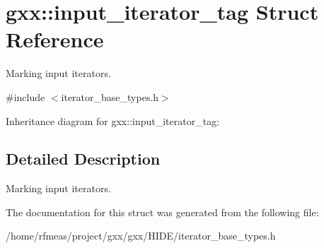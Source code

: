 \hypertarget{structgxx_1_1input__iterator__tag}{}\section{gxx\+:\+:input\+\_\+iterator\+\_\+tag Struct Reference}
\label{structgxx_1_1input__iterator__tag}


Marking input iterators.  




{\ttfamily \#include $<$iterator\+\_\+base\+\_\+types.\+h$>$}



Inheritance diagram for gxx\+:\+:input\+\_\+iterator\+\_\+tag\+:


\subsection{Detailed Description}
Marking input iterators. 

The documentation for this struct was generated from the following file\+:\begin{DoxyCompactItemize}
\item 
/home/rfmeas/project/gxx/gxx/\+H\+I\+D\+E/iterator\+\_\+base\+\_\+types.\+h\end{DoxyCompactItemize}
